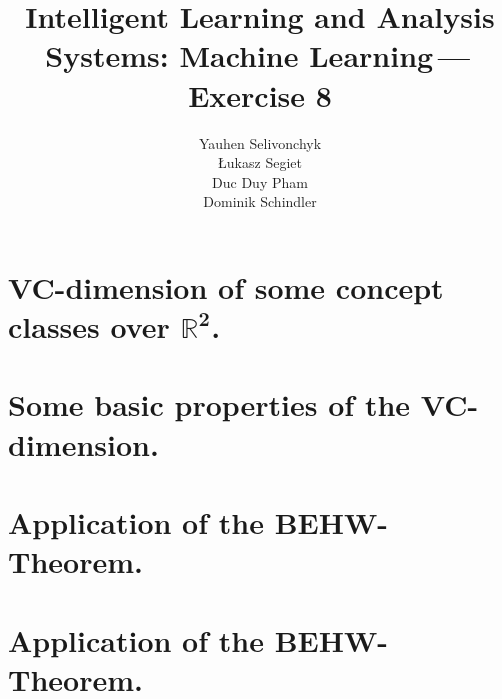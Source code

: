 \documentclass[a4paper]{article}
\newcommand{\exnumber}{8}
\begin{document}
\title{Intelligent Learning and Analysis Systems: Machine Learning\,---\,Exercise \exnumber}
\author{Yauhen Selivonchyk\\ {\L}ukasz Segiet\\Duc Duy Pham\\Dominik Schindler}

\maketitle

\section{VC-dimension of some concept classes over $\boldsymbol{\mathbb{R}^2}$.}




\section{Some basic properties of the VC-dimension.}




\section{Application of the BEHW-Theorem.}


\section{Application of the BEHW-Theorem.}

\end{document}
